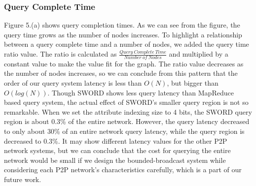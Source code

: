 \documentclass{acm_proc_article-sp}
\begin{document}
\subsubsection{Query Complete Time}
Figure 5.(a) shows query completion times. As we can see from the figure, the query time grows as the number of nodes increases. To highlight a relationship between a query complete time and a number of nodes,
we added the query time ratio value. The ratio is calculated as \begin{math}\frac{Query\ Complete\ Time}{Number\ of\ Nodes}\end{math} and multiplied by a constant value to make the value fit for the graph.
The ratio value decreases as the number of nodes increases, so we can conclude from this pattern that the order of our query system latency is less than $O(N)$, but bigger than $O(log(N))$.
Though SWORD shows less query latency than MapReduce based query system, the actual effect of SWORD's smaller query region is not so remarkable. 
When we set the attribute indexing size to 4 bits, the SWORD query region is about 0.3\% of the entire network. 
However, the query latency decreased to only about 30\% of an entire network query latency, while the query region is decreased to 0.3\%.
It may show different latency values for the other P2P network systems, but we can conclude that the cost for querying the entire network would be small if we design the bounded-broadcast system while considering
each P2P network's characteristics carefully, which is a part of our future work.
\end{document}
